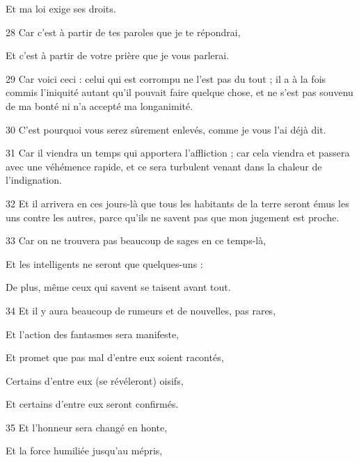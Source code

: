 \par Et ma loi exige ses droits.

\par 28 Car c'est à partir de tes paroles que je te répondrai,

\par Et c'est à partir de votre prière que je vous parlerai.

\par 29 Car voici ceci : celui qui est corrompu ne l'est pas du tout ; il a à la fois commis l'iniquité autant qu'il pouvait faire quelque chose, et ne s'est pas souvenu de ma bonté ni n'a accepté ma longanimité.

\par 30 C'est pourquoi vous serez sûrement enlevés, comme je vous l'ai déjà dit.

\par 31 Car il viendra un temps qui apportera l'affliction ; car cela viendra et passera avec une véhémence rapide, et ce sera turbulent venant dans la chaleur de l'indignation.

\par 32 Et il arrivera en ces jours-là que tous les habitants de la terre seront émus les uns contre les autres, parce qu'ils ne savent pas que mon jugement est proche.

\par 33 Car on ne trouvera pas beaucoup de sages en ce temps-là,

\par Et les intelligents ne seront que quelques-uns :

\par De plus, même ceux qui savent se taisent avant tout.

\par 34 Et il y aura beaucoup de rumeurs et de nouvelles, pas rares,

\par Et l'action des fantasmes sera manifeste,

\par Et promet que pas mal d'entre eux soient racontés,

\par Certains d'entre eux (se révéleront) oisifs,

\par Et certains d'entre eux seront confirmés.

\par 35 Et l'honneur sera changé en honte,

\par Et la force humiliée jusqu'au mépris,

